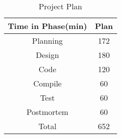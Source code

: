 \documentclass[titlepage,a4paper,12pt]{ltjsreport}
\begin{document}


\begin{table}[h]
    \centering
    \caption{Project Plan}
    \label{test_data}
    \begin{tabular}{|c|c|} \hline
        Time in Phase(min) & Plan \\ \hline
        Planning   &  172\\ \hline
        Design   & 180 \\ \hline
        Code   & 120 \\ \hline
        Compile   & 60 \\ \hline
        Test   & 60 \\ \hline
        Postmortem & 60 \\ \hline
        Total   &  652\\ \hline
    \end{tabular}
\end{table}
\end{document}

